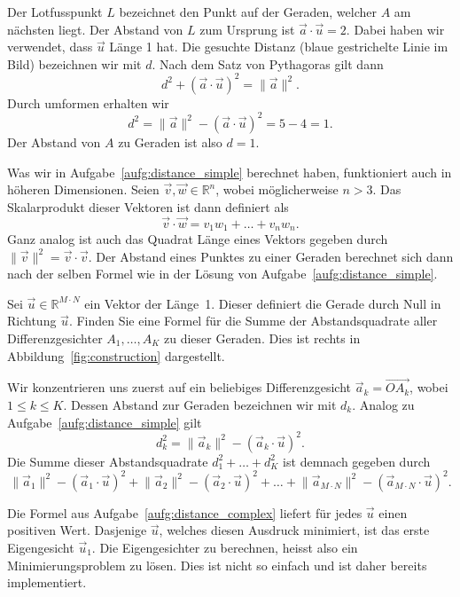 \begin{losung}
	Der Lotfusspunkt $L$ bezeichnet den Punkt auf der Geraden, welcher $A$ am nächsten liegt.
	Der Abstand von $L$ zum Ursprung ist $\vec{a}\cdot\vec{u}=2$.
	Dabei haben wir verwendet, dass $\vec{u}$ Länge 1 hat.
	Die gesuchte Distanz (blaue gestrichelte Linie im Bild) bezeichnen wir mit $d$.
	Nach dem Satz von Pythagoras gilt dann
	\begin{equation*}
		d^2+\left(\vec{a}\cdot\vec{u}\right)^2=\lVert\vec{a}\rVert^2.
	\end{equation*}
	Durch umformen erhalten wir
	\begin{equation*}
		d^2=\lVert\vec{a}\rVert^2-\left(\vec{a}\cdot\vec{u}\right)^2=5-4=1.
	\end{equation*}
	Der Abstand von $A$ zu Geraden ist also $d=1$.
\end{losung}
Was wir in Aufgabe~\ref{aufg:distance_simple} berechnet haben, funktioniert auch in höheren Dimensionen.
Seien $\vec v,\vec w\in\mathbb R^n$, wobei möglicherweise $n>3$.
Das Skalarprodukt dieser Vektoren ist dann definiert als
\begin{equation*}
	\vec v\cdot\vec w=v_1w_1+\ldots+v_nw_n.
\end{equation*}
Ganz analog ist auch das Quadrat Länge eines Vektors gegeben durch $\lVert\vec v\rVert^2=\vec v\cdot\vec v$.
Der Abstand eines Punktes zu einer Geraden berechnet sich dann nach der selben Formel wie in der Lösung von Aufgabe~\ref{aufg:distance_simple}.
\begin{aufgabe} \label{aufg:distance_complex}
	Sei $\vec{u}\in\mathbb R^{M\cdot N}$ ein Vektor der Länge~1.
	Dieser definiert die Gerade durch Null in Richtung $\vec{u}$.
	Finden Sie eine Formel für die Summe der Abstandsquadrate aller Differenzgesichter $A_1,\ldots,A_K$ zu dieser Geraden.
	Dies ist rechts in Abbildung~\ref{fig:construction} dargestellt.
\end{aufgabe}
\begin{losung}
	Wir konzentrieren uns zuerst auf ein beliebiges Differenzgesicht $\vec{a}_k=\overrightarrow{OA_k}$, wobei $1\leq k\leq K$.
	Dessen Abstand zur Geraden bezeichnen wir mit $d_k$.
	Analog zu Aufgabe~\ref{aufg:distance_simple} gilt
	\begin{equation*}
		d_k^2=\lVert\vec{a}_k\rVert^2-\left(\vec{a}_k\cdot\vec{u}\right)^2.
	\end{equation*}
	Die Summe dieser Abstandsquadrate $d_1^2+\ldots+d_K^2$ ist demnach gegeben durch
	\begin{equation*}
		\lVert\vec{a}_1\rVert^2-\left(\vec{a}_1\cdot\vec{u}\right)^2
		+\lVert\vec{a}_2\rVert^2-\left(\vec{a}_2\cdot\vec{u}\right)^2
		+\ldots+
		\lVert\vec{a}_{M\cdot N}\rVert^2-\left(\vec{a}_{M\cdot N}\cdot\vec{u}\right)^2.
	\end{equation*}
\end{losung}
Die Formel aus Aufgabe~\ref{aufg:distance_complex} liefert für jedes $\vec{u}$ einen positiven Wert.
Dasjenige $\vec{u}$, welches diesen Ausdruck minimiert, ist das erste Eigengesicht $\vec{u}_1$.
Die Eigengesichter zu berechnen, heisst also ein Minimierungsproblem zu lösen.
Dies ist nicht so einfach und ist daher bereits implementiert.

